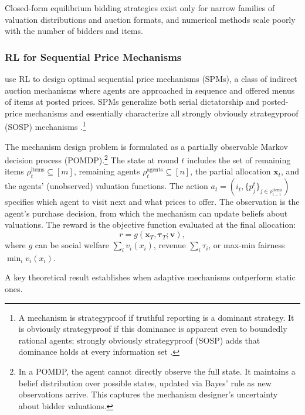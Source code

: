 Closed-form equilibrium bidding strategies exist only for narrow families of valuation distributions and auction formats, and numerical methods scale poorly with the number of bidders and items.


\subsubsection{RL for Sequential Price Mechanisms}

\citet{BreroEtAl2021} use RL to design optimal sequential price mechanisms (SPMs), a class of indirect auction mechanisms where agents are approached in sequence and offered menus of items at posted prices. SPMs generalize both serial dictatorship and posted-price mechanisms and essentially characterize all strongly obviously strategyproof (SOSP) mechanisms \citep{PyciaAndTroyan2019}.\footnote{A mechanism is strategyproof if truthful reporting is a dominant strategy. It is obviously strategyproof if this dominance is apparent even to boundedly rational agents; strongly obviously strategyproof (SOSP) adds that dominance holds at every information set \citep{PyciaAndTroyan2019}.}

The mechanism design problem is formulated as a partially observable Markov decision process (POMDP).\footnote{In a POMDP, the agent cannot directly observe the full state. It maintains a belief distribution over possible states, updated via Bayes' rule as new observations arrive. This captures the mechanism designer's uncertainty about bidder valuations.} The state at round $t$ includes the set of remaining items $\rho_t^{\text{items}} \subseteq [m]$, remaining agents $\rho_t^{\text{agents}} \subseteq [n]$, the partial allocation $\mathbf{x}_t$, and the agents' (unobserved) valuation functions. The action $a_t = (i_t, \{p_j^t\}_{j \in \rho_{t-1}^{\text{items}}})$ specifies which agent to visit next and what prices to offer. The observation is the agent's purchase decision, from which the mechanism can update beliefs about valuations. The reward is the objective function evaluated at the final allocation:
\begin{equation}
r = g(\mathbf{x}_T, \boldsymbol{\tau}_T; \mathbf{v}), \label{eq:brero_reward}
\end{equation}
where $g$ can be social welfare $\sum_{i} v_i(x_i)$, revenue $\sum_i \tau_i$, or max-min fairness $\min_i v_i(x_i)$.

A key theoretical result establishes when adaptive mechanisms outperform static ones.

